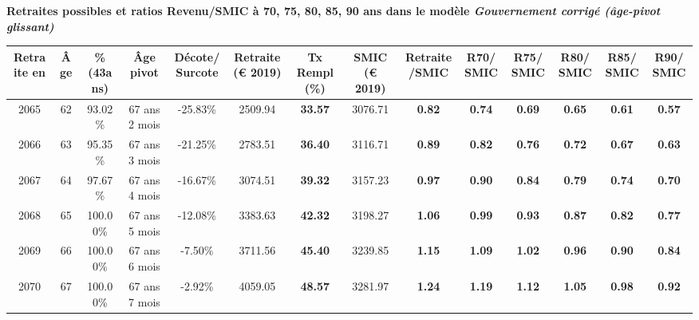  \vspace{0.1cm} 
{\bf \noindent Retraites possibles et ratios Revenu/SMIC à 70, 75, 80, 85, 90 ans dans le modèle \emph{Gouvernement corrigé (âge-pivot glissant)}}  
 
\begin{adjustbox}{max width=\textwidth} 
\begin{tabular}[htb]{|c|c||c|c|c||c|c||c|c||c|c|c|c|c|} 
\hline 
 Retraite en &  Âge &  \%(43ans) &  Âge pivot &  Décote/Surcote &  Retraite (\euro{} 2019) &  Tx Rempl(\%) &  SMIC (\euro{} 2019) &  Retraite/SMIC &  R70/SMIC &  R75/SMIC &  R80/SMIC &  R85/SMIC &  R90/SMIC \\ 
\hline \hline 
 2065 &  62 &  93.02\% &  67 ans 2 mois &  -25.83\% &  2509.94 &  {\bf 33.57} &  3076.71 &  {\bf {\color{red} 0.82}} &  {\bf {\color{red} 0.74}} &  {\bf {\color{red} 0.69}} &  {\bf {\color{red} 0.65}} &  {\bf {\color{red} 0.61}} &  {\bf {\color{red} 0.57}} \\ 
\hline 
 2066 &  63 &  95.35\% &  67 ans 3 mois &  -21.25\% &  2783.51 &  {\bf 36.40} &  3116.71 &  {\bf {\color{red} 0.89}} &  {\bf {\color{red} 0.82}} &  {\bf {\color{red} 0.76}} &  {\bf {\color{red} 0.72}} &  {\bf {\color{red} 0.67}} &  {\bf {\color{red} 0.63}} \\ 
\hline 
 2067 &  64 &  97.67\% &  67 ans 4 mois &  -16.67\% &  3074.51 &  {\bf 39.32} &  3157.23 &  {\bf {\color{red} 0.97}} &  {\bf {\color{red} 0.90}} &  {\bf {\color{red} 0.84}} &  {\bf {\color{red} 0.79}} &  {\bf {\color{red} 0.74}} &  {\bf {\color{red} 0.70}} \\ 
\hline 
 2068 &  65 &  100.00\% &  67 ans 5 mois &  -12.08\% &  3383.63 &  {\bf 42.32} &  3198.27 &  {\bf 1.06} &  {\bf {\color{red} 0.99}} &  {\bf {\color{red} 0.93}} &  {\bf {\color{red} 0.87}} &  {\bf {\color{red} 0.82}} &  {\bf {\color{red} 0.77}} \\ 
\hline 
 2069 &  66 &  100.00\% &  67 ans 6 mois &  -7.50\% &  3711.56 &  {\bf 45.40} &  3239.85 &  {\bf 1.15} &  {\bf 1.09} &  {\bf 1.02} &  {\bf {\color{red} 0.96}} &  {\bf {\color{red} 0.90}} &  {\bf {\color{red} 0.84}} \\ 
\hline 
 2070 &  67 &  100.00\% &  67 ans 7 mois &  -2.92\% &  4059.05 &  {\bf 48.57} &  3281.97 &  {\bf 1.24} &  {\bf 1.19} &  {\bf 1.12} &  {\bf 1.05} &  {\bf {\color{red} 0.98}} &  {\bf {\color{red} 0.92}} \\ 
\hline 
\hline 
\end{tabular} 
\end{adjustbox} 
 
